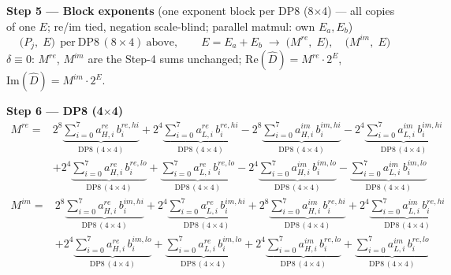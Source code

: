 \documentclass[fleqn]{article}
\newcommand{\DPop}[3]{\mathrm{DP#1}\,(#2\!\times\!#3)}
\begin{document}
\textbf{Step 5 --- Block exponents}\quad
{\small(one exponent block per DP8 (8$\times$4) --- all copies of one $E$; re/im tied, negation scale-blind; parallel matmul: own $E_a,E_b$)}
\[
\big(P_j,\; E\big)\ \ \text{per}\ \DPop{8}{8}{4}\ \text{above}, \qquad E = E_a + E_b
\;\longrightarrow\;
\big(M^{re},\; E\big), \quad \big(M^{im},\; E\big)
\]
$\delta\equiv0$: $M^{re}$, $M^{im}$ are the Step-4 sums unchanged; \quad $\mathrm{Re}(\hat D)=M^{re}\cdot2^{E}$, \ $\mathrm{Im}(\hat D)=M^{im}\cdot2^{E}$.

\textbf{Step 6 --- DP8 (4$\times$4)}
\begin{align*}
M^{re} = {}
  & 2^{8}\underbrace{\sum_{i=0}^{7} a_{H,i}^{re}\, b_i^{re,hi}}_{\DPop{8}{4}{4}}
  + 2^{4}\underbrace{\sum_{i=0}^{7} a_{L,i}^{re}\, b_i^{re,hi}}_{\DPop{8}{4}{4}}
  - 2^{8}\underbrace{\sum_{i=0}^{7} a_{H,i}^{im}\, b_i^{im,hi}}_{\DPop{8}{4}{4}}
  - 2^{4}\underbrace{\sum_{i=0}^{7} a_{L,i}^{im}\, b_i^{im,hi}}_{\DPop{8}{4}{4}} \\[0.2em]
  & + 2^{4}\underbrace{\sum_{i=0}^{7} a_{H,i}^{re}\, b_i^{re,lo}}_{\DPop{8}{4}{4}}
  + \underbrace{\sum_{i=0}^{7} a_{L,i}^{re}\, b_i^{re,lo}}_{\DPop{8}{4}{4}}
  - 2^{4}\underbrace{\sum_{i=0}^{7} a_{H,i}^{im}\, b_i^{im,lo}}_{\DPop{8}{4}{4}}
  - \underbrace{\sum_{i=0}^{7} a_{L,i}^{im}\, b_i^{im,lo}}_{\DPop{8}{4}{4}}
\end{align*}
\begin{align*}
M^{im} = {}
  & 2^{8}\underbrace{\sum_{i=0}^{7} a_{H,i}^{re}\, b_i^{im,hi}}_{\DPop{8}{4}{4}}
  + 2^{4}\underbrace{\sum_{i=0}^{7} a_{L,i}^{re}\, b_i^{im,hi}}_{\DPop{8}{4}{4}}
  + 2^{8}\underbrace{\sum_{i=0}^{7} a_{H,i}^{im}\, b_i^{re,hi}}_{\DPop{8}{4}{4}}
  + 2^{4}\underbrace{\sum_{i=0}^{7} a_{L,i}^{im}\, b_i^{re,hi}}_{\DPop{8}{4}{4}} \\[0.2em]
  & + 2^{4}\underbrace{\sum_{i=0}^{7} a_{H,i}^{re}\, b_i^{im,lo}}_{\DPop{8}{4}{4}}
  + \underbrace{\sum_{i=0}^{7} a_{L,i}^{re}\, b_i^{im,lo}}_{\DPop{8}{4}{4}}
  + 2^{4}\underbrace{\sum_{i=0}^{7} a_{H,i}^{im}\, b_i^{re,lo}}_{\DPop{8}{4}{4}}
  + \underbrace{\sum_{i=0}^{7} a_{L,i}^{im}\, b_i^{re,lo}}_{\DPop{8}{4}{4}}
\end{align*}
\end{document}
